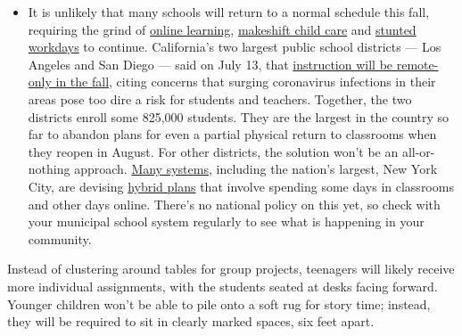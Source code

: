 \begin{itemize}
  \begin{itemize}
  \tightlist
  \item
    It is unlikely that many schools will return to a normal schedule
    this fall, requiring the grind of
    \href{https://www.nytimes3xbfgragh.onion/2020/06/05/us/coronavirus-education-lost-learning.html?action=click\&pgtype=Article\&state=default\&region=MAIN_CONTENT_3\&context=storylines_faq}{online
    learning},
    \href{https://www.nytimes3xbfgragh.onion/2020/05/29/us/coronavirus-child-care-centers.html?action=click\&pgtype=Article\&state=default\&region=MAIN_CONTENT_3\&context=storylines_faq}{makeshift
    child care} and
    \href{https://www.nytimes3xbfgragh.onion/2020/06/03/business/economy/coronavirus-working-women.html?action=click\&pgtype=Article\&state=default\&region=MAIN_CONTENT_3\&context=storylines_faq}{stunted
    workdays} to continue. California's two largest public school
    districts --- Los Angeles and San Diego --- said on July 13, that
    \href{https://www.nytimes3xbfgragh.onion/2020/07/13/us/lausd-san-diego-school-reopening.html?action=click\&pgtype=Article\&state=default\&region=MAIN_CONTENT_3\&context=storylines_faq}{instruction
    will be remote-only in the fall}, citing concerns that surging
    coronavirus infections in their areas pose too dire a risk for
    students and teachers. Together, the two districts enroll some
    825,000 students. They are the largest in the country so far to
    abandon plans for even a partial physical return to classrooms when
    they reopen in August. For other districts, the solution won't be an
    all-or-nothing approach.
    \href{https://bioethics.jhu.edu/research-and-outreach/projects/eschool-initiative/school-policy-tracker/}{Many
    systems}, including the nation's largest, New York City, are
    devising
    \href{https://www.nytimes3xbfgragh.onion/2020/06/26/us/coronavirus-schools-reopen-fall.html?action=click\&pgtype=Article\&state=default\&region=MAIN_CONTENT_3\&context=storylines_faq}{hybrid
    plans} that involve spending some days in classrooms and other days
    online. There's no national policy on this yet, so check with your
    municipal school system regularly to see what is happening in your
    community.
  \end{itemize}
\end{itemize}

Instead of clustering around tables for group projects, teenagers will
likely receive more individual assignments, with the students seated at
desks facing forward. Younger children won't be able to pile onto a soft
rug for story time; instead, they will be required to sit in clearly
marked spaces, six feet apart.

